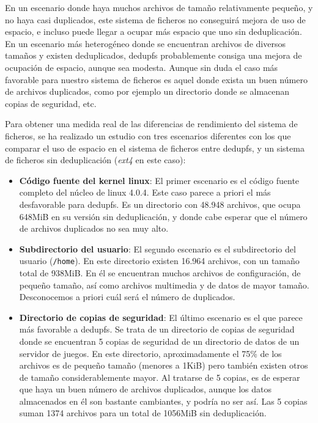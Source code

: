\documentclass[12pt,a4paper]{article}
\begin{document}
En un escenario donde haya muchos archivos de tamaño relativamente pequeño, y no haya casi duplicados, este sistema de ficheros no conseguirá mejora de uso de espacio, e incluso puede llegar a ocupar más espacio que uno sin deduplicación. En un escenario más heterogéneo donde se encuentran archivos de diversos tamaños y existen deduplicados, dedupfs probablemente consiga una mejora de ocupación de espacio, aunque sea modesta. Aunque sin duda el caso más favorable para nuestro sistema de ficheros es aquel donde exista un buen número de archivos duplicados, como por ejemplo un directorio donde se almacenan copias de seguridad, etc.

Para obtener una medida real de las diferencias de rendimiento del sistema de ficheros, se ha realizado un estudio con tres escenarios diferentes con los que comparar el uso de espacio en el sistema de ficheros entre dedupfs, y un sistema de ficheros sin deduplicación (\emph{ext4} en este caso):
\begin{itemize}
 \item \textbf{Código fuente del kernel linux}: El primer escenario es el código fuente completo del núcleo de linux 4.0.4. Este caso parece a priori el más desfavorable para dedupfs. Es un directorio con 48.948 archivos, que ocupa 648MiB en su versión sin deduplicación, y donde cabe esperar que el número de archivos duplicados no sea muy alto.
 \item \textbf{Subdirectorio del usuario}: El segundo escenario es el subdirectorio del usuario (\texttt{\small /home}). En este directorio existen 16.964 archivos, con un tamaño total de 938MiB. En él se encuentran muchos archivos de configuración, de pequeño tamaño, así como archivos multimedia y de datos de mayor tamaño. Desconocemos a priori cuál será el número de duplicados.
 \item \textbf{Directorio de copias de seguridad}: El último escenario es el que parece más favorable a dedupfs. Se trata de un directorio de copias de seguridad donde se encuentran 5 copias de seguridad de un directorio de datos de un servidor de juegos. En este directorio, aproximadamente el 75\% de los archivos es de pequeño tamaño (menores a 1KiB) pero también existen otros de tamaño considerablemente mayor. Al tratarse de 5 copias, es de esperar que haya un buen número de archivos duplicados, aunque los datos almacenados en él son bastante cambiantes, y podría no ser así. Las 5 copias suman 1374 archivos para un total de 1056MiB sin deduplicación.
\end{itemize}
\end{document}
